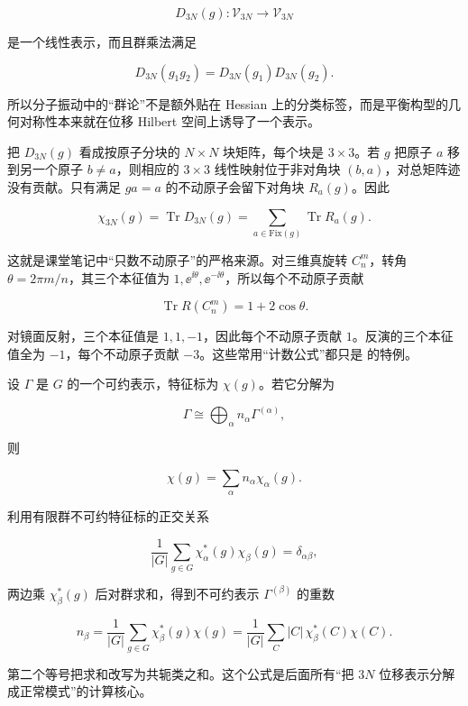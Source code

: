 \[
D_{3N}(g):\mathcal V_{3N}\to\mathcal V_{3N}
\]

是一个线性表示，而且群乘法满足

\[
D_{3N}(g_1g_2)=D_{3N}(g_1)D_{3N}(g_2).
\]

所以分子振动中的“群论”不是额外贴在 Hessian 上的分类标签，而是平衡构型的几何对称性本来就在位移 Hilbert 空间上诱导了一个表示。

把 \(D_{3N}(g)\) 看成按原子分块的 \(N\times N\) 块矩阵，每个块是 \(3\times3\)。若 \(g\) 把原子 \(a\) 移到另一个原子 \(b\neq a\)，则相应的 \(3\times3\) 线性映射位于非对角块 \((b,a)\)，对总矩阵迹没有贡献。只有满足 \(ga=a\) 的不动原子会留下对角块 \(R_a(g)\)。因此

\begin{equation}
\chi_{3N}(g)
=\operatorname{Tr}D_{3N}(g)
=\sum_{a\in\mathrm{Fix}(g)}
\operatorname{Tr}R_a(g).
\label{eq:fixed-atom-character}
\end{equation}

这就是课堂笔记中“只数不动原子”的严格来源。对三维真旋转 \(C_n^m\)，转角 \(\theta=2\pi m/n\)，其三个本征值为 \(1,\ee^{\ii\theta},\ee^{-\ii\theta}\)，所以每个不动原子贡献

\[
\operatorname{Tr}R(C_n^m)
=1+2\cos\theta.
\]

对镜面反射，三个本征值是 \(1,1,-1\)，因此每个不动原子贡献 \(1\)。反演的三个本征值全为 \(-1\)，每个不动原子贡献 \(-3\)。这些常用“计数公式”都只是  的特例。

设 \(\Gamma\) 是 \(G\) 的一个可约表示，特征标为 \(\chi(g)\)。若它分解为

\[
\Gamma\cong\bigoplus_\alpha n_\alpha\Gamma^{(\alpha)},
\]

则

\[
\chi(g)=\sum_\alpha n_\alpha\chi_\alpha(g).
\]

利用有限群不可约特征标的正交关系

\[
\frac1{|G|}
\sum_{g\in G}
\chi_\alpha^*(g)\chi_\beta(g)
=\delta_{\alpha\beta},
\]

两边乘 \(\chi_\beta^*(g)\) 后对群求和，得到不可约表示 \(\Gamma^{(\beta)}\) 的重数

\begin{equation}
n_\beta
=\frac1{|G|}
\sum_{g\in G}
\chi_\beta^*(g)\chi(g)
=\frac1{|G|}
\sum_{C}|C|\,\chi_\beta^*(C)\chi(C).
\label{eq:character-reduction-formula}
\end{equation}

第二个等号把求和改写为共轭类之和。这个公式是后面所有“把 \(3N\) 位移表示分解成正常模式”的计算核心。

